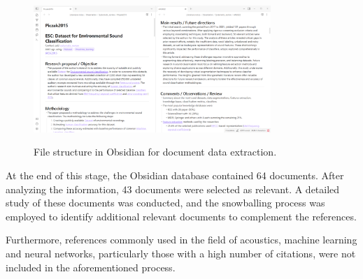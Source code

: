 \begin{figure}[htbp]
    \raggedright
        \caption{File structure in Obsidian for document data extraction.}
        \includegraphics[width=0.80\textwidth]{resources/images/080-systematic_review/Review_Obsidian_01_2023_11.png}
        \label{fig:systematic_review_methodology_obsidian}
\end{figure}

At the end of this stage, the Obsidian database contained 64 documents. After analyzing the information, 43 documents were selected as relevant. A detailed study of these documents was conducted, and the snowballing process was employed to identify additional relevant documents to complement the references.

Furthermore, references commonly used in the field of acoustics, machine learning and neural networks, particularly those with a high number of citations, were not included in the aforementioned process.